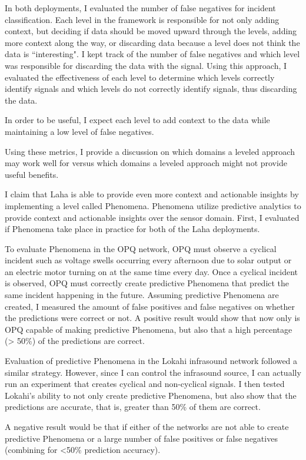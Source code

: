 In both deployments, I evaluated the number of false negatives for incident classification. Each level in the framework is responsible for not only adding context, but deciding if data should be moved upward through the levels, adding more context along the way, or discarding data because a level does not think the data is ``interesting". I kept track of the number of false negatives and which level was responsible for discarding the data with the signal. Using this approach, I evaluated the effectiveness of each level to determine which levels correctly identify signals and which levels do not correctly identify signals, thus discarding the data.

In order to be useful, I expect each level to add context to the data while maintaining a low level of false negatives.

Using these metrics, I provide a discussion on which domains a leveled approach may work well for versus which domains a leveled approach might not provide useful benefits.

I claim that Laha is able to provide even more context and actionable insights by implementing a level called Phenomena. Phenomena utilize predictive analytics to provide context and actionable insights over the sensor domain. First, I evaluated if Phenomena take place in practice for both of the Laha deployments. 

To evaluate Phenomena in the OPQ network, OPQ must observe a cyclical incident such as voltage swells occurring every afternoon due to solar output or an electric motor turning on at the same time every day. Once a cyclical incident is observed, OPQ must correctly create predictive Phenomena that predict the same incident happening in the future. Assuming predictive Phenomena are created, I measured the amount of false positives and false negatives on whether the predictions were correct or not. A positive result would show that now only is OPQ capable of making predictive Phenomena, but also that a high percentage (> 50\%) of the predictions are correct.

Evaluation of predictive Phenomena in the Lokahi infrasound network followed a similar strategy. However, since I can control the infrasound source, I can actually run an experiment that creates cyclical and non-cyclical signals. I then tested Lokahi's ability to not only create predictive Phenomena, but also show that the predictions are accurate, that is, greater than 50\% of them are correct. 

A negative result would be that if either of the networks are not able to create predictive Phenomena or a large number of false positives or false negatives (combining for <50\% prediction accuracy).

